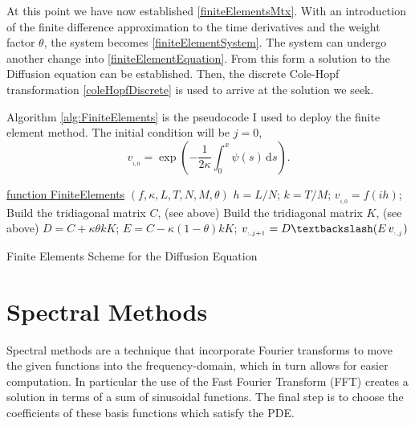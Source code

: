 \documentclass[undefended]{sfuthesis}
\begin{document}
At this point we have now established \eqref{finiteElementsMtx}. With an introduction of the finite difference approximation to the time derivatives and the weight factor $\theta$, the system becomes \eqref{finiteElementSystem}. The system can undergo another change into \eqref{finiteElementEquation}. From this form a solution to the Diffusion equation can be established. Then, the discrete Cole-Hopf transformation \eqref{coleHopfDiscrete} is used to arrive at the solution we seek.

Algorithm \ref{alg:FiniteElements} is the pseudocode I used to deploy the finite element method. The initial condition will be $j = 0$, \[v_{_{i, 0}} = \exp \left(- \frac{1}{2 \kappa} \int_{0}^{x} \psi(s) \,\mathrm{d} s \right).\] 

\begin{algorithm}[h!]
	\underline{function FiniteElements} $(f, \kappa, L, T, N, M, \theta)$\;
	$h = L/N$; 
	$k = T/M$; 
	{
		$v_{_{i, 0}} = f(ih)$; 
	}
	Build the tridiagonal matrix $C$, (see above)\;
	Build the tridiagonal matrix $K$, (see above)\;
	$D = C + \kappa \theta k K$; 
	$E = C - \kappa (1 - \theta) k K$; 
	{
		$v_{_{:, j + 1}} = D \textbackslash(E\,v_{_{:, j}})$ 
	}
	\caption{Finite Elements Scheme for the Diffusion Equation}
	\label{alg:FiniteElements}
\end{algorithm}

\section{Spectral Methods}

Spectral methods are a technique that incorporate Fourier transforms to move the given functions into the frequency-domain, which in turn allows for easier computation. In particular the use of the Fast Fourier Transform (FFT) creates a solution in terms of a sum of sinusoidal functions. The final step is to choose the coefficients of these basis functions which satisfy the PDE.
\end{document}

